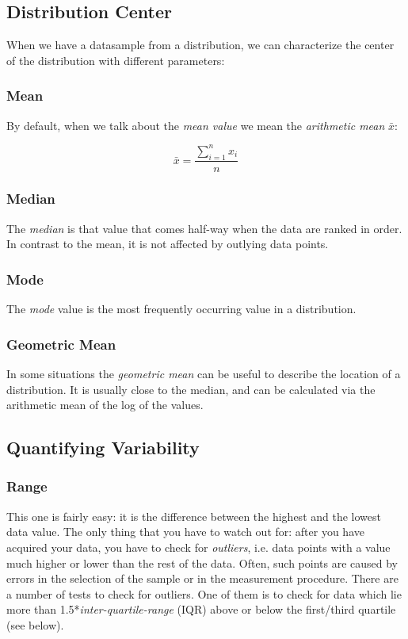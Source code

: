 \subsection{Distribution Center}

When we have a datasample from a distribution, we can characterize the center of the distribution with different parameters:

\subsubsection{Mean} 
By default, when we talk about the \emph{mean value} we mean the \emph{arithmetic mean} $\bar{x}$:

\begin{equation}
  \bar{x} = \frac{{\sum\limits_{i = 1}^n {{x_i}} }}{n}
\end{equation}

\subsubsection{Median} 
The \emph{median} is that value that comes half-way when the data are ranked in order.
In contrast to the mean, it is not affected by outlying data points.

\subsubsection{Mode} 
The \emph{mode} value is the most frequently occurring value in a distribution.

\subsubsection{Geometric Mean}
In some situations the \emph{geometric mean} can be useful to describe the location of a distribution. It is usually close to the median, and can be calculated via the arithmetic mean of the log of the values.

\subsection{Quantifying Variability}\label{sec:centiles}

\subsubsection{Range}
This one is fairly easy: it is the difference between the highest and the lowest data value.
The only thing that you have to watch out for: after you have acquired your data, you have to check for \emph{outliers}, i.e. data points with a value much higher or lower than the rest of the data. Often, such points are caused by errors in the selection of the sample or in the measurement procedure. There are a number of tests to check for outliers. One of them is to check for data which lie more than 1.5*\emph{inter-quartile-range} (IQR) above or below the first/third quartile (see below).


